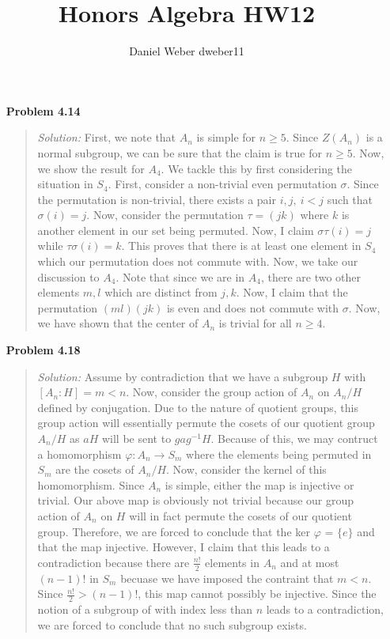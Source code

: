 \documentclass{article}
\title{Honors Algebra HW12}
\author{Daniel Weber dweber11}
\newcommand{\Solution}{\textit{Solution: }}
\begin{document}
    \maketitle
    \begin{enumerate}
        \item[\textbf{Problem 4.14}]
        \begin{quote}
            \Solution First, we note that $A_n$ is simple for $n \geq 5$. Since $Z(A_n)$ is a normal subgroup, we can be sure that the claim is true for $n \geq 5$. Now, we show
            the result for $A_4$. We tackle this by first considering the situation in $S_4$. First, consider a non-trivial even permutation $\sigma$. Since the permutation is non-trivial,
            there exists a pair $i, j, \: i < j$ such that $\sigma(i) = j$. Now, consider the permutation $\tau = (jk)$ where $k$ is another element in our set being permuted. Now, I claim
            $\sigma \tau(i) = j$ while $\tau\sigma(i) = k$. This proves that there is at least one element in $S_4$ which our permutation does not commute with. Now, we take our discussion to 
            $A_4$. Note that since we are in $A_4$, there are two other elements $m, l$ which are distinct from $j, k$. Now, I claim that the permutation $(ml)(jk)$ is even and does not commute 
            with $\sigma$. Now, we have shown that the center of $A_n$ is trivial for all $n \geq 4$. \qedsymbol
        \end{quote} 
        \item[\textbf{Problem 4.18}]
        \begin{quote}
            \Solution Assume by contradiction that we have a subgroup $H$ with $[A_n : H] = m < n$. Now, consider the group action of $A_n$ on $A_n/H$ defined by conjugation. Due to the nature of
            quotient groups, this group action will essentially permute the cosets of our quotient group $A_n/H$ as $aH$ will be sent to $gag^{-1}H$. 
            Because of this, we may contruct a homomorphism $\varphi: A_n \to S_m$ where the elements being permuted in $S_m$ are the cosets of $A_n/H$. Now, consider the kernel of this homomorphism.
            Since $A_n$ is simple, either the map is injective or trivial. Our above map is obviously not trivial because our group action of $A_n$ on $H$ will in fact permute the cosets of our quotient
            group. Therefore, we are forced to conclude that the ker $\varphi$ = $\{e\}$ and that the map injective. However, I claim that this leads to a contradiction because there are $\frac{n!}{2}$ 
            elements in $A_n$ and at most $(n - 1)!$ in $S_m$ becuase we have imposed the contraint that $m < n$. Since $\frac{n!}{2} > (n - 1)!$, this map cannot possibly be injective. Since the notion of
            a subgroup of with index less than $n$ leads to a contradiction, we are forced to conclude that no such subgroup exists.


\end{quote}
\end{enumerate}
\end{document}

